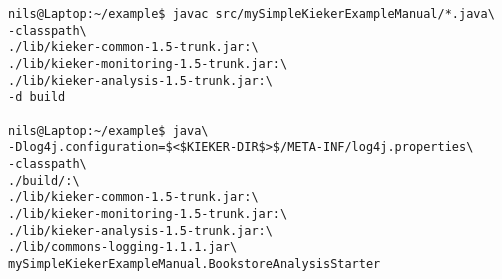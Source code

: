 \begin{lstlisting} 			
nils@Laptop:~/example$ javac src/mySimpleKiekerExampleManual/*.java\
-classpath\ 		
./lib/kieker-common-1.5-trunk.jar:\
./lib/kieker-monitoring-1.5-trunk.jar:\
./lib/kieker-analysis-1.5-trunk.jar:\
-d build

nils@Laptop:~/example$ java\
-Dlog4j.configuration=$<$KIEKER-DIR$>$/META-INF/log4j.properties\
-classpath\ 	
./build/:\
./lib/kieker-common-1.5-trunk.jar:\
./lib/kieker-monitoring-1.5-trunk.jar:\
./lib/kieker-analysis-1.5-trunk.jar:\
./lib/commons-logging-1.1.1.jar\
mySimpleKiekerExampleManual.BookstoreAnalysisStarter 
\end{lstlisting}	